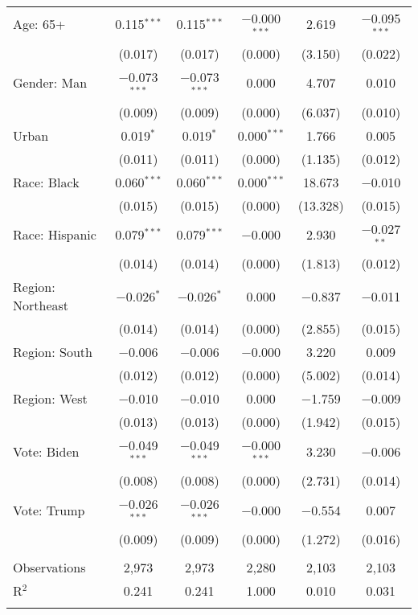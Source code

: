 \begin{tabular}{@{\extracolsep{5pt}}lccccc}
  Age: 65+ & 0.115$^{***}$ & 0.115$^{***}$ & $-$0.000$^{***}$ & 2.619 & $-$0.095$^{***}$ \\ 
  & (0.017) & (0.017) & (0.000) & (3.150) & (0.022) \\ 
  Gender: Man & $-$0.073$^{***}$ & $-$0.073$^{***}$ & 0.000 & 4.707 & 0.010 \\ 
  & (0.009) & (0.009) & (0.000) & (6.037) & (0.010) \\ 
  Urban & 0.019$^{*}$ & 0.019$^{*}$ & 0.000$^{***}$ & 1.766 & 0.005 \\ 
  & (0.011) & (0.011) & (0.000) & (1.135) & (0.012) \\ 
  Race: Black & 0.060$^{***}$ & 0.060$^{***}$ & 0.000$^{***}$ & 18.673 & $-$0.010 \\ 
  & (0.015) & (0.015) & (0.000) & (13.328) & (0.015) \\ 
  Race: Hispanic & 0.079$^{***}$ & 0.079$^{***}$ & $-$0.000 & 2.930 & $-$0.027$^{**}$ \\ 
  & (0.014) & (0.014) & (0.000) & (1.813) & (0.012) \\ 
  Region: Northeast & $-$0.026$^{*}$ & $-$0.026$^{*}$ & 0.000 & $-$0.837 & $-$0.011 \\ 
  & (0.014) & (0.014) & (0.000) & (2.855) & (0.015) \\ 
  Region: South & $-$0.006 & $-$0.006 & $-$0.000 & 3.220 & 0.009 \\ 
  & (0.012) & (0.012) & (0.000) & (5.002) & (0.014) \\ 
  Region: West & $-$0.010 & $-$0.010 & 0.000 & $-$1.759 & $-$0.009 \\ 
  & (0.013) & (0.013) & (0.000) & (1.942) & (0.015) \\ 
  Vote: Biden & $-$0.049$^{***}$ & $-$0.049$^{***}$ & $-$0.000$^{***}$ & 3.230 & $-$0.006 \\ 
  & (0.008) & (0.008) & (0.000) & (2.731) & (0.014) \\ 
  Vote: Trump & $-$0.026$^{***}$ & $-$0.026$^{***}$ & $-$0.000 & $-$0.554 & 0.007 \\ 
  & (0.009) & (0.009) & (0.000) & (1.272) & (0.016) \\ 
 \hline \\[-1.8ex] 

Observations & 2,973 & 2,973 & 2,280 & 2,103 & 2,103 \\ 
R$^{2}$ & 0.241 & 0.241 & 1.000 & 0.010 & 0.031 \\ 
\hline 
\hline \\[-1.8ex] 
\end{tabular} 